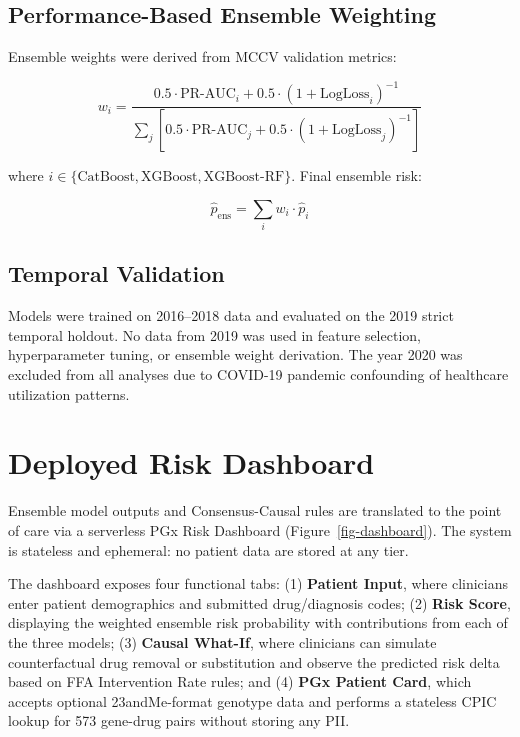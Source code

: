 \documentclass[
  12pt,
]{book}
\begin{document}
\subsection{Performance-Based Ensemble
Weighting}\label{performance-based-ensemble-weighting}

Ensemble weights were derived from MCCV validation metrics:

\[w_i = \frac{0.5 \cdot \text{PR-AUC}_i + 0.5 \cdot (1 + \text{LogLoss}_i)^{-1}}
             {\sum_j \left[ 0.5 \cdot \text{PR-AUC}_j + 0.5 \cdot (1 + \text{LogLoss}_j)^{-1} \right]}\]

where \(i \in \{\text{CatBoost}, \text{XGBoost}, \text{XGBoost-RF}\}\).
Final ensemble risk:

\[\hat{p}_{\text{ens}} = \sum_i w_i \cdot \hat{p}_i\]

\subsection{Temporal Validation}\label{temporal-validation}

Models were trained on 2016--2018 data and evaluated on the 2019 strict
temporal holdout. No data from 2019 was used in feature selection,
hyperparameter tuning, or ensemble weight derivation. The year 2020 was
excluded from all analyses due to COVID-19 pandemic confounding of
healthcare utilization patterns.

\section{Deployed Risk Dashboard}\label{sec-dashboard}

Ensemble model outputs and Consensus-Causal rules are translated to the
point of care via a serverless PGx Risk Dashboard
(Figure~\ref{fig-dashboard}). The system is stateless and ephemeral: no
patient data are stored at any tier.

The dashboard exposes four functional tabs: (1) \textbf{Patient Input},
where clinicians enter patient demographics and submitted drug/diagnosis
codes; (2) \textbf{Risk Score}, displaying the weighted ensemble risk
probability with contributions from each of the three models; (3)
\textbf{Causal What-If}, where clinicians can simulate counterfactual
drug removal or substitution and observe the predicted risk delta based
on FFA Intervention Rate rules; and (4) \textbf{PGx Patient Card}, which
accepts optional 23andMe-format genotype data and performs a stateless
CPIC lookup for 573 gene-drug pairs without storing any PII.
\end{document}
